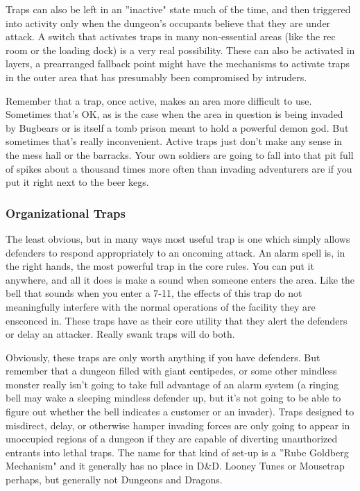 Traps can also be left in an ''inactive" state much of the time, and then triggered into activity only when the dungeon's occupants believe that they are under attack. A switch that activates traps in many non-essential areas (like the rec room or the loading dock) is a very real possibility. These can also be activated in layers, a prearranged fallback point might have the mechanisms to activate traps in the outer area that has presumably been compromised by intruders.

Remember that a trap, once active, makes an area more difficult to use. Sometimes that's OK, as is the case when the area in question is being invaded by Bugbears or is itself a tomb prison meant to hold a powerful demon god. But sometimes that's really inconvenient. Active traps just don't make any sense in the mess hall or the barracks. Your own soldiers are going to fall into that pit full of spikes about a thousand times more often than invading adventurers are if you put it right next to the beer kegs.

\subsubsection{Organizational Traps}

The least obvious, but in many ways most useful trap is one which simply allows defenders to respond appropriately to an oncoming attack. An alarm spell is, in the right hands, the most powerful trap in the core rules. You can put it anywhere, and all it does is make a sound when someone enters the area. Like the bell that sounds when you enter a 7-11, the effects of this trap do not meaningfully interfere with the normal operations of the facility they are ensconced in. These traps have as their core utility that they alert the defenders or delay an attacker. Really swank traps will do both.

Obviously, these traps are only worth anything if you have defenders. But remember that a dungeon filled with giant centipedes, or some other mindless monster really isn't going to take full advantage of an alarm system (a ringing bell may wake a sleeping mindless defender up, but it's not going to be able to figure out whether the bell indicates a customer or an invader). Traps designed to misdirect, delay, or otherwise hamper invading forces are only going to appear in unoccupied regions of a dungeon if they are capable of diverting unauthorized entrants into lethal traps. The name for that kind of set-up is a ''Rube Goldberg Mechanism" and it generally has no place in D\&D. Looney Tunes or Mousetrap perhaps, but generally not Dungeons and Dragons.


